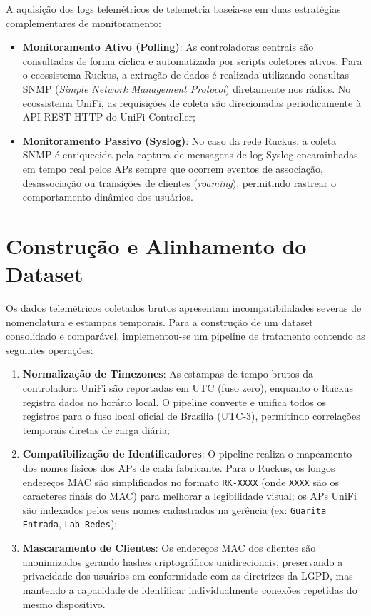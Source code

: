 A aquisição dos logs telemétricos de telemetria baseia-se em duas estratégias complementares de monitoramento:
\begin{itemize}
	\item \textbf{Monitoramento Ativo (Polling)}: As controladoras centrais são consultadas de forma cíclica e automatizada por scripts coletores ativos. Para o ecossistema Ruckus, a extração de dados é realizada utilizando consultas SNMP (\textit{Simple Network Management Protocol}) diretamente nos rádios. No ecossistema UniFi, as requisições de coleta são direcionadas periodicamente à API REST HTTP do UniFi Controller;
	\item \textbf{Monitoramento Passivo (Syslog)}: No caso da rede Ruckus, a coleta SNMP é enriquecida pela captura de mensagens de log Syslog encaminhadas em tempo real pelos APs sempre que ocorrem eventos de associação, desassociação ou transições de clientes (\textit{roaming}), permitindo rastrear o comportamento dinâmico dos usuários.
\end{itemize}

\section{Construção e Alinhamento do Dataset}
\label{sec:metodologia_dataset}

Os dados telemétricos coletados brutos apresentam incompatibilidades severas de nomenclatura e estampas temporais. Para a construção de um dataset consolidado e comparável, implementou-se um pipeline de tratamento contendo as seguintes operações:
\begin{enumerate}
	\item \textbf{Normalização de Timezones}: As estampas de tempo brutos da controladora UniFi são reportadas em UTC (fuso zero), enquanto o Ruckus registra dados no horário local. O pipeline converte e unifica todos os registros para o fuso local oficial de Brasília (UTC-3), permitindo correlações temporais diretas de carga diária;
	\item \textbf{Compatibilização de Identificadores}: O pipeline realiza o mapeamento dos nomes físicos dos APs de cada fabricante. Para o Ruckus, os longos endereços MAC são simplificados no formato \texttt{RK-XXXX} (onde \texttt{XXXX} são os caracteres finais do MAC) para melhorar a legibilidade visual; os APs UniFi são indexados pelos seus nomes cadastrados na gerência (ex: \texttt{Guarita Entrada}, \texttt{Lab Redes});
	\item \textbf{Mascaramento de Clientes}: Os endereços MAC dos clientes são anonimizados gerando hashes criptográficos unidirecionais, preservando a privacidade dos usuários em conformidade com as diretrizes da LGPD, mas mantendo a capacidade de identificar individualmente conexões repetidas do mesmo dispositivo.
\end{enumerate}

